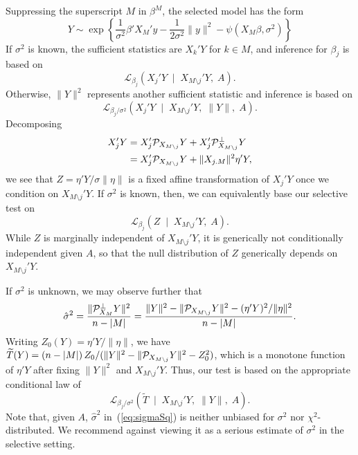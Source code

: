 \documentclass{article}
\theoremstyle{definition}
\newcommand{\bX}{X}
\newcommand{\Gv}{\;\;\big|\;\;}
\newcommand{\proj}{\cP}
\newcommand{\cL}{\mathcal{L}}
\begin{document}
Suppressing the superscript $M$ in $\beta^{M}$, the selected model has the form
\begin{equation}
  Y \sim \exp\left\{\frac{1}{\sigma^2}\beta'{\bX_M}'y - \frac{1}{2\sigma^2}\|y\|^2 - \psi(\bX_M\beta,\sigma^2)\right\}
\end{equation}
If $\sigma^2$ is known, the sufficient statistics are $X_k'Y$ for $k\in M$, and inference for $\beta_j$ is based on
\begin{equation}
  \cL_{\beta_j}\left(X_j'Y \Gv {\bX_{M\setminus j}}'Y, \; A\right).
\end{equation}
Otherwise, $\|Y\|^2$ represents another sufficient statistic and inference is based on
\begin{equation}
  \cL_{\beta_j/\sigma^2}\left(X_j'Y \Gv {\bX_{M\setminus j}}'Y, \; \|Y\|, \; A\right).
\end{equation}
Decomposing
\begin{align}
  X_j'Y
  &= X_j'\proj_{\bX_{M\setminus j}} Y
  + X_j'\proj_{\bX_{M\setminus j}}^\perp Y \\
  &= X_j'\proj_{\bX_{M\setminus j}} Y + \|X_{j.M}\|^2 \eta'Y,
\end{align}
we see that $Z=\eta'Y / \sigma \|\eta\|$ is a fixed affine transformation of $X_j'Y$ once we condition on $X_{M\setminus j}'Y$. If $\sigma^2$ is known, then, we can equivalently base our selective test on
\begin{equation}
  \cL_{\beta_j}\left(Z \Gv {\bX_{M\setminus j}}'Y, \; A\right).
\end{equation}
While $Z$ is marginally independent of $X_{M\setminus j}'Y$, it is generically not conditionally independent given $A$, so that the null distribution of $Z$ generically depends on $X_{M\setminus j}'Y$.

If $\sigma^2$ is unknown, we may observe further that
\begin{equation}\label{eq:sigmaSq}
\hat \sigma^2 = \frac{\|\proj_{\bX_M}^\perp Y\|^2}{n-|M|}
= \frac{\|Y\|^2 - \|\proj_{\bX_{M\setminus j}} Y\|^2 - (\eta'Y)^2/\|\eta\|^2}{n-|M|}.
\end{equation}
Writing $Z_0(Y) = \eta'Y / \|\eta\|$, we have
$\widetilde T(Y) = (n-|M|) \,Z_0/(\|Y\|^2 - \|\proj_{X_{M\setminus j}} Y\|^2 - Z_0^2)$, which is a monotone function of $\eta'Y$ after fixing $\|Y\|^2$ and $X_{M\setminus j}'Y$. Thus, our test is based on the appropriate conditional law of
\begin{equation}
  \cL_{\beta_j/\sigma^2}\left(\widetilde T \Gv {\bX_{M\setminus j}}'Y, \; \|Y\|, \; A\right).
\end{equation}
Note that, given $A$, $\hat\sigma^2$ in~(\ref{eq:sigmaSq}) is neither unbiased for $\sigma^2$ nor $\chi^2$-distributed. We recommend against viewing it as a serious estimate of $\sigma^2$ in the selective setting.
\end{document}
